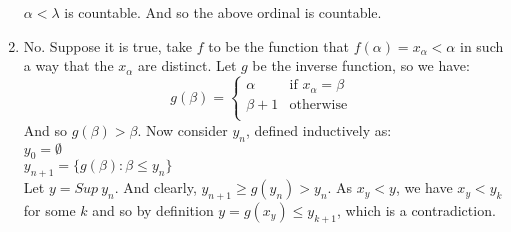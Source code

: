 \begin{enumerate}
    $\alpha<\lambda$ is countable. And so the above ordinal is countable.\\
\item No. Suppose it is true, take $f$ to be the function that $f(\alpha)=x_\alpha <\alpha$ in such a way that the $x_\alpha$ are distinct. Let $g$ be the inverse function, so we have:\\
\begin{equation*}
g(\beta)= \left\{
\begin{array}{ll}
\alpha & \text{if } x_\alpha = \beta\\
\beta+1 & \text{otherwise } \\
\end{array} \right.
\end{equation*}
And so $g(\beta) > \beta$. Now consider $y_n$, defined inductively as:\\
$y_0=\emptyset$\\
$y_{n+1}=\{g(\beta): \beta \le y_n\}$\\
Let $y = Sup~y_n$. And clearly, $y_{n+1} \ge g(y_n) > y_n$. As $x_y < y$, we have $x_y < y_k$ for some $k$ and so by definition $y=g(x_y) \le y_{k+1}$, which is a contradiction.
\end{enumerate}
